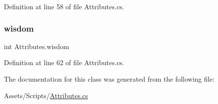 Definition at line 58 of file Attributes.\+cs.

\mbox{\label{class_attributes_a48ec0beacd46bb9b9e206becde146d69}} 
\subsubsection{\texorpdfstring{wisdom}{wisdom}}
{\footnotesize\ttfamily int Attributes.\+wisdom\hspace{0.3cm}{\ttfamily [get]}}



Definition at line 62 of file Attributes.\+cs.



The documentation for this class was generated from the following file\+:\begin{DoxyCompactItemize}
\item 
Assets/\+Scripts/\mbox{\hyperlink{_attributes_8cs}{Attributes.\+cs}}\end{DoxyCompactItemize}
